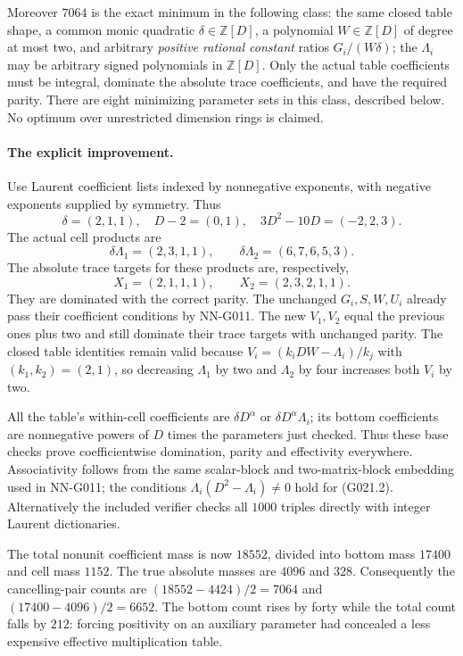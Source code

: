 Moreover $7064$ is the exact minimum in the following class:
the same closed table shape, a common monic quadratic
$\delta\in\mathbb Z[D]$, a polynomial $W\in\mathbb Z[D]$ of
degree at most two, and arbitrary \emph{positive rational constant}
ratios $G_i/(W\delta)$; the $\Lambda_i$ may be arbitrary signed
polynomials in $\mathbb Z[D]$. Only the actual table coefficients
must be integral, dominate the absolute trace coefficients, and
have the required parity. There are eight minimizing parameter
sets in this class, described below. No optimum over unrestricted
dimension rings is claimed.

\paragraph{The explicit improvement.}
Use Laurent coefficient lists indexed by nonnegative exponents,
with negative exponents supplied by symmetry. Thus
\[
 \delta=(2,1,1),\quad D-2=(0,1),\quad
 3D^2-10D=(-2,2,3).
\]
The actual cell products are
\[
 \delta\Lambda_1=(2,3,1,1),\qquad
 \delta\Lambda_2=(6,7,6,5,3).                           \tag{G021.3}
\]
The absolute trace targets for these products are, respectively,
\[
 X_1=(2,1,1,1),\qquad X_2=(2,3,2,1,1).                 \tag{G021.4}
\]
They are dominated with the correct parity. The unchanged $G_i,S,W,U_i$
already pass their coefficient conditions by NN-G011. The new
$V_1,V_2$ equal the previous ones plus two and still dominate their
trace targets with unchanged parity. The closed table identities
remain valid because $V_i=(k_iDW-\Lambda_i)/k_j$ with
$(k_1,k_2)=(2,1)$, so decreasing $\Lambda_1$ by two and
$\Lambda_2$ by four increases both $V_i$ by two.

All the table's within-cell coefficients are $\delta D^\alpha$
or $\delta D^\alpha\Lambda_i$; its bottom coefficients are
nonnegative powers of $D$ times the parameters just checked.
Thus these base checks prove coefficientwise domination, parity
and effectivity everywhere. Associativity follows from the same
scalar-block and two-matrix-block embedding used in NN-G011;
the conditions $\Lambda_i(D^2-\Lambda_i)\ne0$ hold for (G021.2).
Alternatively the included verifier checks all $1000$ triples
directly with integer Laurent dictionaries.

The total nonunit coefficient mass is now $18552$, divided into
bottom mass $17400$ and cell mass $1152$. The true absolute masses
are $4096$ and $328$. Consequently the cancelling-pair counts are
$(18552-4424)/2=7064$ and $(17400-4096)/2=6652$.
The bottom count rises by forty while the total count falls by
$212$: forcing positivity on an auxiliary parameter had concealed
a less expensive effective multiplication table.

